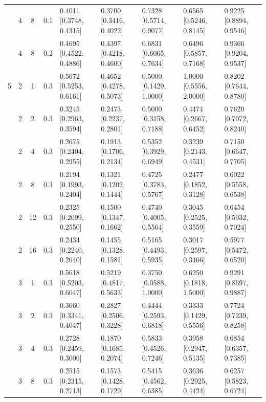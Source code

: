 \begin{tabular}{@{}cccclllll@{}}
 & 4 & 8 & 0.1 & 0.4011 {\tiny[0.3748, 0.4315]} & 0.3700 {\tiny[0.3416, 0.4022]} & 0.7328 {\tiny[0.5714, 0.9077]} & 0.6565 {\tiny[0.5246, 0.8145]} & 0.9225 {\tiny[0.8894, 0.9546]} \\
 & 4 & 8 & 0.2 & 0.4695 {\tiny[0.4522, 0.4886]} & 0.4397 {\tiny[0.4218, 0.4600]} & 0.6831 {\tiny[0.6065, 0.7634]} & 0.6496 {\tiny[0.5857, 0.7168]} & 0.9366 {\tiny[0.9204, 0.9537]} \\
\midrule
5 & 2 & 1 & 0.3 & 0.5672 {\tiny[0.5253, 0.6161]} & 0.4652 {\tiny[0.4278, 0.5073]} & 0.5000 {\tiny[0.1429, 1.0000]} & 1.0000 {\tiny[0.5556, 2.0000]} & 0.8202 {\tiny[0.7644, 0.8780]} \\
 & 2 & 2 & 0.3 & 0.3245 {\tiny[0.2963, 0.3594]} & 0.2473 {\tiny[0.2237, 0.2801]} & 0.5000 {\tiny[0.3158, 0.7188]} & 0.4474 {\tiny[0.2667, 0.6452]} & 0.7620 {\tiny[0.7072, 0.8240]} \\
 & 2 & 4 & 0.3 & 0.2675 {\tiny[0.2404, 0.2955]} & 0.1913 {\tiny[0.1706, 0.2134]} & 0.5352 {\tiny[0.3929, 0.6949]} & 0.3239 {\tiny[0.2143, 0.4531]} & 0.7150 {\tiny[0.6647, 0.7705]} \\
 & 2 & 8 & 0.3 & 0.2194 {\tiny[0.1993, 0.2404]} & 0.1321 {\tiny[0.1202, 0.1444]} & 0.4725 {\tiny[0.3783, 0.5767]} & 0.2477 {\tiny[0.1852, 0.3128]} & 0.6022 {\tiny[0.5558, 0.6538]} \\
 & 2 & 12 & 0.3 & 0.2325 {\tiny[0.2099, 0.2550]} & 0.1500 {\tiny[0.1347, 0.1662]} & 0.4740 {\tiny[0.4005, 0.5564]} & 0.3045 {\tiny[0.2525, 0.3559]} & 0.6454 {\tiny[0.5932, 0.7024]} \\
 & 2 & 16 & 0.3 & 0.2434 {\tiny[0.2240, 0.2640]} & 0.1455 {\tiny[0.1328, 0.1581]} & 0.5165 {\tiny[0.4493, 0.5935]} & 0.3017 {\tiny[0.2597, 0.3466]} & 0.5977 {\tiny[0.5472, 0.6520]} \\
 & 3 & 1 & 0.3 & 0.5618 {\tiny[0.5203, 0.6047]} & 0.5219 {\tiny[0.4817, 0.5633]} & 0.3750 {\tiny[0.0588, 1.0000]} & 0.6250 {\tiny[0.1818, 1.5000]} & 0.9291 {\tiny[0.8697, 0.9887]} \\
 & 3 & 2 & 0.3 & 0.3660 {\tiny[0.3341, 0.4047]} & 0.2827 {\tiny[0.2506, 0.3228]} & 0.4444 {\tiny[0.2593, 0.6818]} & 0.3333 {\tiny[0.1429, 0.5556]} & 0.7724 {\tiny[0.7239, 0.8258]} \\
 & 3 & 4 & 0.3 & 0.2728 {\tiny[0.2459, 0.3006]} & 0.1870 {\tiny[0.1685, 0.2074]} & 0.5833 {\tiny[0.4526, 0.7246]} & 0.3958 {\tiny[0.2947, 0.5135]} & 0.6854 {\tiny[0.6357, 0.7385]} \\
 & 3 & 8 & 0.3 & 0.2515 {\tiny[0.2315, 0.2713]} & 0.1573 {\tiny[0.1428, 0.1729]} & 0.5415 {\tiny[0.4562, 0.6385]} & 0.3636 {\tiny[0.2925, 0.4424]} & 0.6257 {\tiny[0.5823, 0.6724]} \\

\end{tabular}
